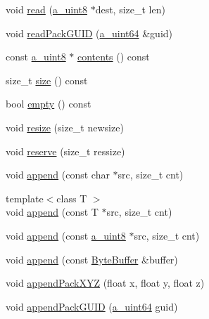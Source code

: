\begin{DoxyCompactItemize}
\item 
void \hyperlink{class_agmd_network_1_1_byte_buffer_a32544dcf9beaa6a471ec5849095fd5b8}{read} (\hyperlink{_common_defines_8h_afbe6c09973474a1f78f870f39073398f}{a\+\_\+uint8} $\ast$dest, size\+\_\+t len)
\item 
void \hyperlink{class_agmd_network_1_1_byte_buffer_ad2b2299f2aaaff825adf342d258bf65d}{read\+Pack\+G\+U\+I\+D} (\hyperlink{_common_defines_8h_a6c5192ec3c55d6e5b13d2dbaa082bdea}{a\+\_\+uint64} \&guid)
\item 
const \hyperlink{_common_defines_8h_afbe6c09973474a1f78f870f39073398f}{a\+\_\+uint8} $\ast$ \hyperlink{class_agmd_network_1_1_byte_buffer_a193ec5f96f93c117a002e907ff68d488}{contents} () const 
\item 
size\+\_\+t \hyperlink{class_agmd_network_1_1_byte_buffer_a098026cc32635b486d7df2cfca21c192}{size} () const 
\item 
bool \hyperlink{class_agmd_network_1_1_byte_buffer_a488ec8af3ca929c630dd32861e5d4a0e}{empty} () const 
\item 
void \hyperlink{class_agmd_network_1_1_byte_buffer_a37880adf7904c78ec0dad7ba64ed138a}{resize} (size\+\_\+t newsize)
\item 
void \hyperlink{class_agmd_network_1_1_byte_buffer_a5e37218fdf95855c94a6fc078eb04138}{reserve} (size\+\_\+t ressize)
\item 
void \hyperlink{class_agmd_network_1_1_byte_buffer_ae2d656c131f1102ad830efe9673616bc}{append} (const char $\ast$src, size\+\_\+t cnt)
\item 
{\footnotesize template$<$class T $>$ }\\void \hyperlink{class_agmd_network_1_1_byte_buffer_a6663f933d5c3f78f05daede33820a422}{append} (const T $\ast$src, size\+\_\+t cnt)
\item 
void \hyperlink{class_agmd_network_1_1_byte_buffer_a63b3ad581be2d3416df03710584890e4}{append} (const \hyperlink{_common_defines_8h_afbe6c09973474a1f78f870f39073398f}{a\+\_\+uint8} $\ast$src, size\+\_\+t cnt)
\item 
void \hyperlink{class_agmd_network_1_1_byte_buffer_a12e7c740a5c5b9376b59f22d9dd84d22}{append} (const \hyperlink{class_agmd_network_1_1_byte_buffer}{Byte\+Buffer} \&buffer)
\item 
void \hyperlink{class_agmd_network_1_1_byte_buffer_a72e3ae23cdd38aeef8828961cb4065b3}{append\+Pack\+X\+Y\+Z} (float x, float y, float z)
\item 
void \hyperlink{class_agmd_network_1_1_byte_buffer_a8e22884ecb579bcc4631d144b546bca0}{append\+Pack\+G\+U\+I\+D} (\hyperlink{_common_defines_8h_a6c5192ec3c55d6e5b13d2dbaa082bdea}{a\+\_\+uint64} guid)

\end{DoxyCompactItemize}
